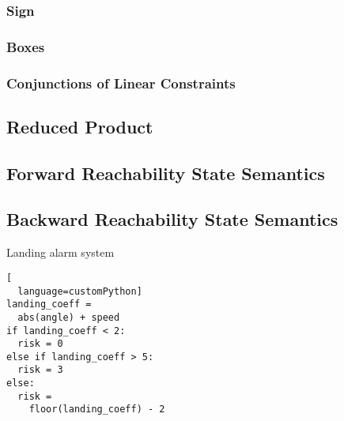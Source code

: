 \subsubsection*{Sign}

\subsubsection*{Boxes}

\subsubsection*{Conjunctions of Linear Constraints}

\subsection{Reduced Product}

\subsection{Forward Reachability State Semantics}

\subsection{Backward Reachability State Semantics}

\begin{marginlisting}
  \caption{Landing alarm system}
  \vspace{\lineheight}
\begin{lstlisting}[
  language=customPython]
landing_coeff =
  abs(angle) + speed
if landing_coeff < 2:
  risk = 0
else if landing_coeff > 5:
  risk = 3
else:
  risk =
    floor(landing_coeff) - 2
  \end{lstlisting}
\end{marginlisting}
